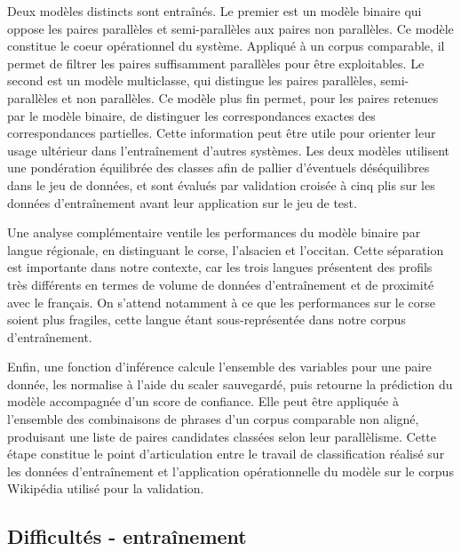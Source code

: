 Deux modèles distincts sont entraînés. Le premier est un modèle binaire qui oppose les paires parallèles
et semi-parallèles aux paires non parallèles. Ce modèle constitue le coeur opérationnel du système. Appliqué
à un corpus comparable, il permet de filtrer les paires suffisamment parallèles pour
être exploitables. Le second est un modèle multiclasse, qui distingue les paires
parallèles, semi-parallèles et non parallèles. Ce modèle plus fin permet, pour les paires retenues par
le modèle binaire, de distinguer les correspondances exactes des correspondances partielles. Cette information
peut être utile pour orienter leur usage ultérieur dans l'entraînement d'autres systèmes. Les
deux modèles utilisent une pondération équilibrée des classes afin de pallier d'éventuels déséquilibres
dans le jeu de données, et sont évalués par validation croisée à cinq plis sur les données
d'entraînement avant leur application sur le jeu de test.

Une analyse complémentaire ventile les performances du modèle binaire par langue régionale, en distinguant
le corse, l'alsacien et l'occitan. Cette séparation est importante dans notre contexte, car les trois
langues présentent des profils très différents en termes de volume de données d'entraînement et de proximité
avec le français. On s'attend notamment à ce que les performances sur le corse soient plus fragiles, cette
langue étant sous-représentée dans notre corpus d'entraînement.

Enfin, une fonction d'inférence calcule l'ensemble des variables pour une paire donnée, les normalise à l'aide du scaler
sauvegardé, puis retourne la prédiction du modèle accompagnée d'un score de confiance. Elle peut être
appliquée à l'ensemble des combinaisons de phrases d'un corpus comparable non aligné, produisant une
liste de paires candidates classées selon leur parallèlisme. Cette étape constitue le point
d'articulation entre le travail de classification réalisé sur les données d'entraînement
et l'application opérationnelle du modèle sur le corpus Wikipédia utilisé pour la validation.

\subsection{Difficultés - entraînement}


